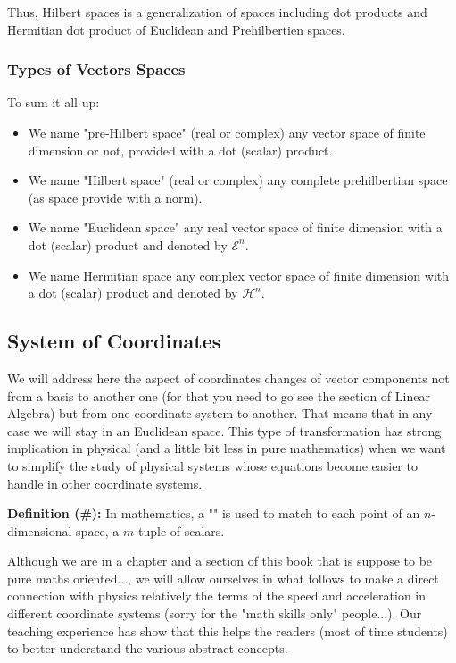 	Thus, Hilbert spaces is a generalization of spaces including dot products and Hermitian dot product of Euclidean and Prehilbertien spaces.
	
	\subsubsection{Types of Vectors Spaces}
	To sum it all up:
	\begin{itemize}
		\item We name "pre-Hilbert space" (real or complex) any vector space of finite dimension or not, provided with a dot (scalar) product.
		
		\item We name "Hilbert space" (real or complex) any complete prehilbertian space (as space provide with a norm).
		
		\item We name "Euclidean space" any real vector space of finite dimension with a dot (scalar) product and denoted by $\mathcal{E}^n$.
		
		\item We name Hermitian space any complex vector space of finite dimension with a dot (scalar) product and denoted by $\mathcal{H}^n$.
	\end{itemize}
	
	\pagebreak
	\subsection{System of Coordinates}\label{system of coordinates}
	We will address here the aspect of coordinates changes of vector components not from a basis to another one (for that you need to go see the section of Linear Algebra) but from one coordinate system to another. That means that in any case we will stay in an Euclidean space. This type of transformation has strong implication in physical (and a little bit less in pure mathematics) when we want to simplify the study of physical systems whose equations become easier to handle in other coordinate systems.
	
	\textbf{Definition (\#\mydef):} In mathematics, a "" is used to match to each point of an $n$-dimensional space, a $m$-tuple of scalars.
	
	Although we are in a chapter and a section of this book that is suppose to be pure maths oriented..., we will allow ourselves in what follows to make a direct connection with physics relatively the terms of the speed and acceleration in different coordinate systems (sorry for the "math skills only" people...). Our teaching experience has show that this helps the readers (most of time students) to better understand the various abstract concepts.
	
